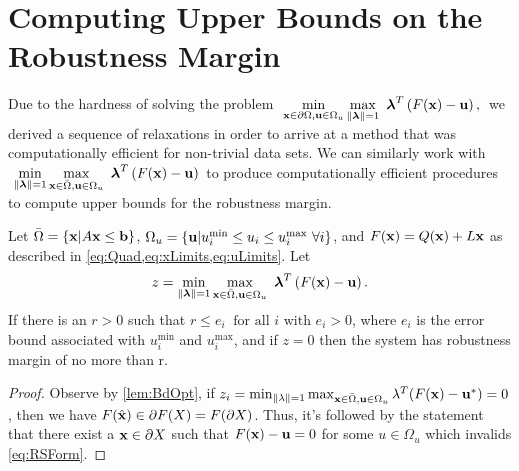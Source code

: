 \section{Computing Upper Bounds on the Robustness Margin} \label{sec:outbdform}  

Due to the hardness of solving the problem $~\displaystyle \min\limits_{\vx\in \partial \Omega, \vu\in\Omega_u}\max\limits_{\norm{\vlambda}=1 }\ \vlambda^T\left(F(\vx)-\vu\right),\,$ we derived a sequence of relaxations in order to arrive at a method that was computationally efficient for non-trivial data sets. 
We can similarly work with $~\displaystyle \min\limits_{\lVert\boldsymbol{\lambda}\rVert=1}\max\limits_{\mathbf{x}\in \bar{\Omega}, \mathbf{u}\in\Omega_u}\ \boldsymbol{\lambda}^T\left(F(\mathbf{x})-\mathbf{u}\right) \,$ to produce computationally efficient procedures to compute upper bounds for the robustness margin. 

\bigskip
\begin{thm}\label{thm:OPTfeasOut} 
Let $\bar{\Omega}=\{\mathbf{x}| A\mathbf{x}\leq \mathbf{b}\}$, $\Omega_{u}=\{\mathbf{u}| u^{\min}_i\leq u_i \leq u^{\max}_i \ \forall i \}$, and $F(\mathbf{x})=Q(\mathbf{x})+L\mathbf{x}$ as described in \cref{eq:Quad,eq:xLimits,eq:uLimits}. 
Let
\[
  z = \min\limits_{\lVert\boldsymbol{\lambda}\rVert=1}\max\limits_{\mathbf{x}\in \bar{\Omega}, \mathbf{u}\in\Omega_u}\ \boldsymbol{\lambda}^T\left(F(\mathbf{x})-\mathbf{u}\right).
\]
If there is an $r>0$ such that $r \leq e_i \ \mbox{ for all } i \mbox{ with } e_i>0$, where $e_i$ is the error bound associated with $ u^{\min}_i$ and $ u^{\max}_i$, and if $z=0$ then the system has robustness margin of no more than r.

\medskip
\begin{proof} 
  Observe by \cref{lem:BdOpt}, if $z_i = \min_{\|\lambda\|=1}\max_{\mathbf{x}\in\bar{\Omega}, \mathbf{u}\in\Omega_u}\lambda^T(F(\mathbf{x})-\mathbf{u}^*)=0$, then we have $F(\hat{\mathbf{x}})\in \partial F(X)=F(\partial X)$. Thus, it's followed by the statement that there exist a $\mathbf{x}\in \partial X$ such that $F(\mathbf{x})-\mathbf{u}=0$ for some $u\in \Omega_u$ which invalids \cref{eq:RSForm}.
%
\end{proof}
\end{thm}

